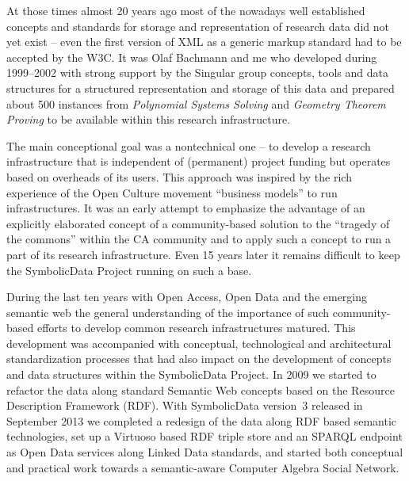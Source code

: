 \documentclass{llncs}
\newcommand{\SD}{{\sc Symbo\-lic\-Data}}
\begin{document}
At those times almost 20 years ago most of the nowadays well established
concepts and standards for storage and representation of research data did not
yet exist -- even the first version of XML as a generic markup standard had to
be accepted by the W3C. It was Olaf Bachmann and me who developed during
1999--2002 with strong support by the Singular group concepts, tools and data
structures for a structured representation and storage of this data and
prepared about 500 instances from \emph{Polynomial Systems Solving} and
\emph{Geometry Theorem Proving} to be available within this research
infrastructure.

The main conceptional goal was a nontechnical one -- to develop a research
infrastructure that is independent of (permanent) project funding but operates
based on overheads of its users. This approach was inspired by the rich
experience of the Open Culture movement ``business models'' to run
infrastructures. It was an early attempt to emphasize the advantage of an
explicitly elaborated concept of a community-based solution to the ``tragedy
of the commons'' \cite{hardin} within the CA community and to apply such a
concept to run a part of its research infrastructure.  Even 15 years later it
remains difficult to keep the {\SD} Project running on such a base.
\medskip

During the last ten years with Open Access, Open Data and the emerging
semantic web the general understanding of the importance of such
community-based efforts to develop common research infrastructures matured.
This development was accompanied with conceptual, technological and
architectural standardization processes that had also impact on the
development of concepts and data structures within the {\SD} Project.  In 2009
we started to refactor the data along standard Semantic Web concepts based on
the Resource Description Framework (RDF).  With {\SD} version~3 released in
September 2013 we completed a redesign of the data along RDF based semantic
technologies, set up a Virtuoso based RDF triple store and an SPARQL endpoint
as Open Data services along Linked Data standards, and started both conceptual
and practical work towards a semantic-aware Computer Algebra Social Network.
\end{document}
